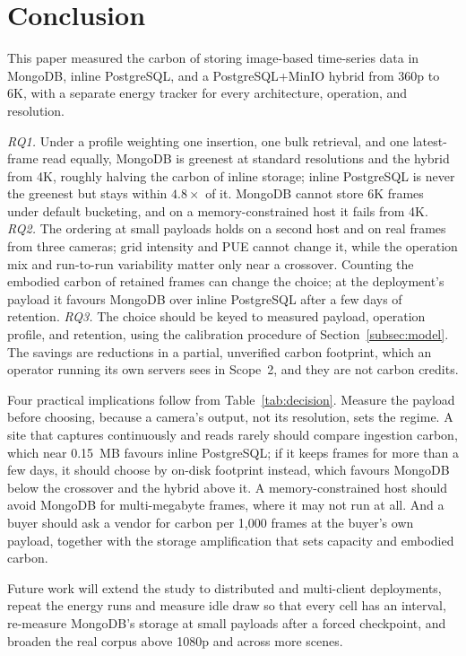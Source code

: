 \documentclass[pdflatex,sn-basic]{sn-jnl}%
\begin{document}
\section{Conclusion}\label{sec:conclusion}

This paper measured the carbon of storing image-based time-series data in MongoDB, inline PostgreSQL, and a PostgreSQL+MinIO hybrid from 360p to 6K, with a separate energy tracker for every architecture, operation, and resolution.

\emph{RQ1.} Under a profile weighting one insertion, one bulk retrieval, and one latest-frame read equally, MongoDB is greenest at standard resolutions and the hybrid from 4K, roughly halving the carbon of inline storage; inline PostgreSQL is never the greenest but stays within $4.8\times$ of it. MongoDB cannot store 6K frames under default bucketing, and on a memory-constrained host it fails from 4K. \emph{RQ2.} The ordering at small payloads holds on a second host and on real frames from three cameras; grid intensity and PUE cannot change it, while the operation mix and run-to-run variability matter only near a crossover. Counting the embodied carbon of retained frames can change the choice; at the deployment's payload it favours MongoDB over inline PostgreSQL after a few days of retention. \emph{RQ3.} The choice should be keyed to measured payload, operation profile, and retention, using the calibration procedure of Section~\ref{subsec:model}. The savings are reductions in a partial, unverified carbon footprint, which an operator running its own servers sees in Scope~2, and they are not carbon credits.

Four practical implications follow from Table~\ref{tab:decision}. Measure the payload before choosing, because a camera's output, not its resolution, sets the regime. A site that captures continuously and reads rarely should compare ingestion carbon, which near 0.15~MB favours inline PostgreSQL; if it keeps frames for more than a few days, it should choose by on-disk footprint instead, which favours MongoDB below the crossover and the hybrid above it. A memory-constrained host should avoid MongoDB for multi-megabyte frames, where it may not run at all. And a buyer should ask a vendor for carbon per 1{,}000 frames at the buyer's own payload, together with the storage amplification that sets capacity and embodied carbon.

Future work will extend the study to distributed and multi-client deployments, repeat the energy runs and measure idle draw so that every cell has an interval, re-measure MongoDB's storage at small payloads after a forced checkpoint, and broaden the real corpus above 1080p and across more scenes.

\backmatter


\end{document}
